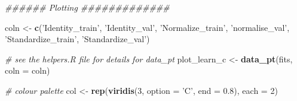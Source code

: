 \documentclass[]{article}
\newenvironment{Shaded}{\begin{snugshade}}{\end{snugshade}}
\newcommand{\CommentTok}[1]{\textcolor[rgb]{0.56,0.35,0.01}{\textit{#1}}}
\newcommand{\DataTypeTok}[1]{\textcolor[rgb]{0.13,0.29,0.53}{#1}}
\newcommand{\DecValTok}[1]{\textcolor[rgb]{0.00,0.00,0.81}{#1}}
\newcommand{\FloatTok}[1]{\textcolor[rgb]{0.00,0.00,0.81}{#1}}
\newcommand{\KeywordTok}[1]{\textcolor[rgb]{0.13,0.29,0.53}{\textbf{#1}}}
\newcommand{\NormalTok}[1]{#1}
\newcommand{\StringTok}[1]{\textcolor[rgb]{0.31,0.60,0.02}{#1}}
\begin{document}
\begin{Shaded}
\begin{Highlighting}[]
{{{{{{\CommentTok{###### Plotting #############}

\NormalTok{coln <-}\StringTok{ }\KeywordTok{c}\NormalTok{(}\StringTok{'Identity_train'}\NormalTok{, }\StringTok{'Identity_val'}\NormalTok{,}
          \StringTok{'Normalize_train'}\NormalTok{, }\StringTok{'normalise_val'}\NormalTok{,}
          \StringTok{'Standardize_train'}\NormalTok{, }\StringTok{'Standardize_val'}\NormalTok{)}

\CommentTok{# see the helpers.R file for details for data_pt}
\NormalTok{plot_learn_c <-}\StringTok{ }\KeywordTok{data_pt}\NormalTok{(fits, }\DataTypeTok{coln =}\NormalTok{ coln)}

\CommentTok{# colour palette}
\NormalTok{col <-}\StringTok{ }\KeywordTok{rep}\NormalTok{(}\KeywordTok{viridis}\NormalTok{(}\DecValTok{3}\NormalTok{, }\DataTypeTok{option =} \StringTok{'C'}\NormalTok{, }\DataTypeTok{end =} \FloatTok{0.8}\NormalTok{), }\DataTypeTok{each =} \DecValTok{2}\NormalTok{) }

}}}}}}
\end{Highlighting}
\end{Shaded}
\end{document}
